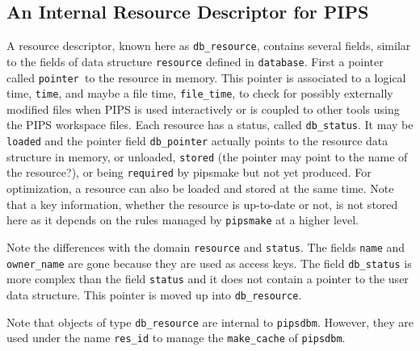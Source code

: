 \documentclass[a4paper]{article}
\begin{document}



\subsection{An Internal Resource Descriptor for PIPS}
\label{sec:rs}

A resource descriptor, known here as \verb/db_resource/, contains
several fields, similar to the fields of data structure
\verb/resource/ defined in \verb/database/. First a pointer called
\verb/pointer /to the resource in memory.  This pointer is associated
to a logical time, \verb/time/, and maybe a file time,
\verb/file_time/, to check for possibly externally modified files when
PIPS is used interactively or is coupled to other tools using the PIPS
workspace files. Each resource has a status, called
\verb/db_status/. It may be \verb/loaded/ and the pointer field
\verb/db_pointer/ actually points to the resource data structure in
memory, or unloaded, \verb/stored/ (the pointer may point to the name
of the resource?), or being \verb/required/ by pipsmake but not yet
produced. For optimization, a resource can also be loaded and stored
at the same time. Note that a key information, whether the resource is
up-to-date or not, is not stored here as it depends on the rules
managed by \verb/pipsmake/ at a higher level.



Note the differences with the domain \verb/resource/ and
\verb/status/. The fields \verb/name/ and \verb/owner_name/ are gone
because they are used as access keys. The field \verb/db_status/ is
more complex than the field \verb/status/ and it does not contain a
pointer to the user data structure. This pointer is moved up into
\verb/db_resource/.

Note that objects of type \verb/db_resource/ are internal to
\verb/pipsdbm/. However, they are used under the name \verb/res_id/ to
manage the \verb/make_cache/ of \verb/pipsdbm/.
\end{document}
